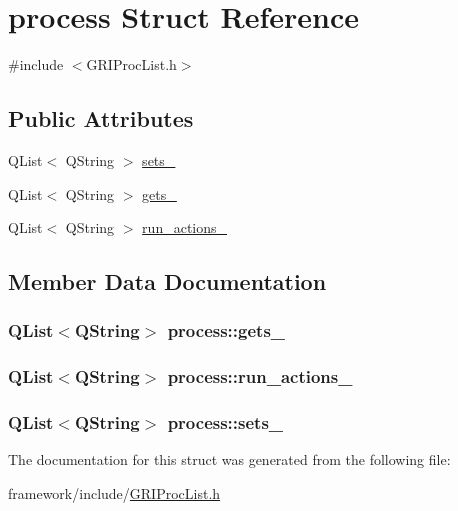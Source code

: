 \hypertarget{structprocess}{\section{process \-Struct \-Reference}
\label{structprocess}
}


{\ttfamily \#include $<$\-G\-R\-I\-Proc\-List.\-h$>$}

\subsection*{\-Public \-Attributes}
\begin{DoxyCompactItemize}
\item 
\-Q\-List$<$ \-Q\-String $>$ \hyperlink{structprocess_aa388041d78033a30b60c5e0e25993937}{sets\-\_\-}
\item 
\-Q\-List$<$ \-Q\-String $>$ \hyperlink{structprocess_a47ba7f796b99ba58a43092d69201448f}{gets\-\_\-}
\item 
\-Q\-List$<$ \-Q\-String $>$ \hyperlink{structprocess_abe7f4f15835aed23cbef5389cce5380d}{run\-\_\-actions\-\_\-}
\end{DoxyCompactItemize}


\subsection{\-Member \-Data \-Documentation}
\hypertarget{structprocess_a47ba7f796b99ba58a43092d69201448f}{
\subsubsection[{gets\-\_\-}]{\setlength{\rightskip}{0pt plus 5cm}\-Q\-List$<$\-Q\-String$>$ {\bf process\-::gets\-\_\-}}}\label{structprocess_a47ba7f796b99ba58a43092d69201448f}
\hypertarget{structprocess_abe7f4f15835aed23cbef5389cce5380d}{
\subsubsection[{run\-\_\-actions\-\_\-}]{\setlength{\rightskip}{0pt plus 5cm}\-Q\-List$<$\-Q\-String$>$ {\bf process\-::run\-\_\-actions\-\_\-}}}\label{structprocess_abe7f4f15835aed23cbef5389cce5380d}
\hypertarget{structprocess_aa388041d78033a30b60c5e0e25993937}{
\subsubsection[{sets\-\_\-}]{\setlength{\rightskip}{0pt plus 5cm}\-Q\-List$<$\-Q\-String$>$ {\bf process\-::sets\-\_\-}}}\label{structprocess_aa388041d78033a30b60c5e0e25993937}


\-The documentation for this struct was generated from the following file\-:\begin{DoxyCompactItemize}
\item 
framework/include/\hyperlink{GRIProcList_8h}{\-G\-R\-I\-Proc\-List.\-h}\end{DoxyCompactItemize}
